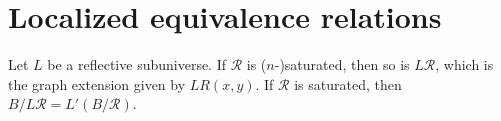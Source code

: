 \begin{comment}
By the coherence lemma this type is equivalent to the type
\begin{align*}
P_1 & : \prd{x,y,y':A} R(y,y')\to R(x,y) \simeq R(x,y') \\
P_r & : \prd{x,y:A} P_1(x,\rho(y))\htpy \idfunc \\
Q_0 & : \prd{x,x':A} R(x,x')\to \prd{y:A} R(x,y) \simeq R(x',y) \\
Q_1 & : \prd{x,x':A}{p:R(x,x')}{y,y':A}{q:R(y,y')} P_1(x',q)\circ Q_0(p,y)\htpy Q_0(p,y')\circ P_1(x,q) \\
Q_r & : \prd{x,x':A}{p:R(x,x')}{y:A} \ct{Q_1(p,\rho(y))}{P_r(x)Q_0(p,y)} \htpy P_r(x')Q_0(p,y) \\
H_0 & : \prd{x:A}{y:A} Q_0(\rho(x),y)\htpy \idfunc \\
H_1 & : \prd{x:A}{y,y':A}{q:R(y,y')} H_0(x,y)\htpy \ct{Q_1(\rho(x),q)}{H_0(x,y')} \\
H_r & : \prd{x:A}{y:A} H_1(x,\rho(y)) \cdots \\
\sigma_0 & : \prd{x:A} R(x,x) \\
\sigma_1 & : \prd{x,y:A}{p:R(x,y)} Q_0(p,x,\sigma_0(x))=\sigma_0(y) \\
\sigma_r & : \prd{x:A} \sigma_1(\rho(x))= H_0(x,x) \\
K_0 & : \prd{x,x':A}{p:R(x,x')} Q_0(r,\sigma_0(x))\htpy \idfunc
\end{align*}
\end{comment}

\section{Localized equivalence relations}

\begin{prp}
Let $L$ be a reflective subuniverse. If $\mathcal{R}$ is ($n$-)saturated, then so is $L\mathcal{R}$, which is the graph extension given by $LR(x,y)$. If $\mathcal{R}$ is saturated, then $B/L\mathcal{R}=L'(B/\mathcal{R})$. 
\end{prp}

